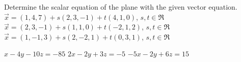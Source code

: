 
\begin{Exercise}[
name={},
title={}, 
difficulty=0,
origin={\cite{SM}}]
Determine the scalar equation of the plane with the given vector equation.
\Question $\vec{x} = (1,4,7) + s(2,3,-1) + t(4,1,0)$, $s,t\in\Re$
\Question $\vec{x} = (2,3,-1) + s(1,1,0) + t(-2,1,2)$, $s,t\in\Re$
\Question $\vec{x} = (1,-1,3) + s(2,-2,1) + t(0,3,1)$, $s,t\in\Re$
\end{Exercise}

\begin{Answer}
\begin{multicols}{2}
\Question $x-4y-10z=-85$
\Question $2x-2y+3z=-5$
\Question $-5x-2y+6z=15$
\EndCurrentQuestion
\end{multicols}
\end{Answer}
